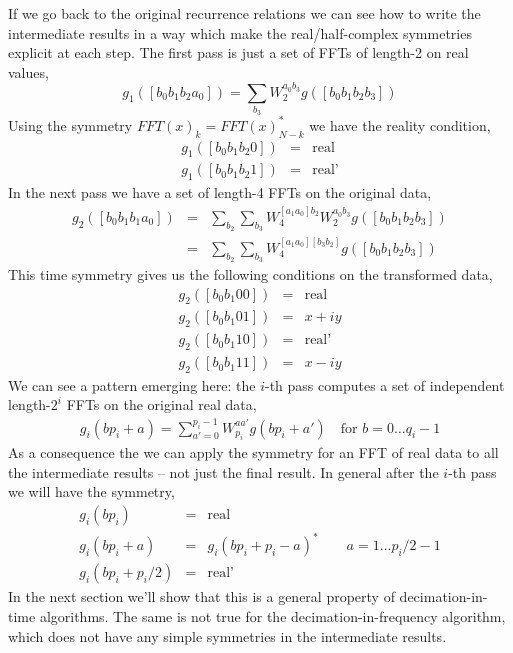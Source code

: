 \documentclass[fleqn,12pt]{article}
\begin{document}
If we go back to the original recurrence relations we can see how to
write the intermediate results in a way which make the
real/half-complex symmetries explicit at each step. The first pass is
just a set of FFTs of length-2 on real values,
%
\begin{equation}
g_1([b_0 b_1 b_2 a_0]) = \sum_{b_3} W^{a_0 b_3}_2 g([b_0 b_1 b_2 b_3])
\end{equation}
%
Using the symmetry $FFT(x)_k = FFT(x)^*_{N-k}$ we have the reality
condition,
%
\begin{eqnarray}
g_1([b_0 b_1 b_2 0]) &=& \mbox{real} \\
g_1([b_0 b_1 b_2 1]) &=& \mbox{real'} 
\end{eqnarray}
%
In the next pass we have a set of length-4 FFTs on the original data,
%
\begin{eqnarray}
g_2([b_0 b_1 b_1 a_0]) 
&=&
\sum_{b_2}\sum_{b_3} 
W^{[a_1 a_0]b_2}_4 W^{a_0 b_3}_2 
g([b_0 b_1 b_2 b_3]) \\
&=&
\sum_{b_2}\sum_{b_3} 
W^{[a_1 a_0][b_3 b_2]}_4
g([b_0 b_1 b_2 b_3])
\end{eqnarray}
%
This time symmetry gives us the following conditions on the
transformed data,
%
\begin{eqnarray}
g_2([b_0 b_1 0 0]) &=& \mbox{real} \\
g_2([b_0 b_1 0 1]) &=& x + i y  \\
g_2([b_0 b_1 1 0]) &=& \mbox{real'} \\
g_2([b_0 b_1 1 1]) &=& x - i y 
\end{eqnarray}
%
We can see a pattern emerging here: the $i$-th pass computes a set of
independent length-$2^i$ FFTs on the original real data,
%
\begin{eqnarray}
g_i ( b p_i  + a ) = \sum_{a' = 0}^{p_i-1} W_{p_i}^{aa'} g(b p_i + a') 
\quad 
\mbox{for $b = 0 \dots q_i - 1$}
\end{eqnarray}
%
As a consequence the we can apply the symmetry for an FFT of real data
to all the intermediate results -- not just the final result.
In general after the $i$-th pass we will
have the symmetry,
%
\begin{eqnarray}
g_i(b p_i) &=& \mbox{real} \\
g_i(b p_i + a) &=& g_i(b p_i + p_i - a)^* \qquad a = 1 \dots p_{i}/2 - 1  \\
g_i(b p_i + p_{i}/2) &=& \mbox{real'} 
\end{eqnarray}
%
In the next section we'll show that this is a general property of
decimation-in-time algorithms. The same is not true for the
decimation-in-frequency algorithm, which does not have any simple
symmetries in the intermediate results.
\end{document}
